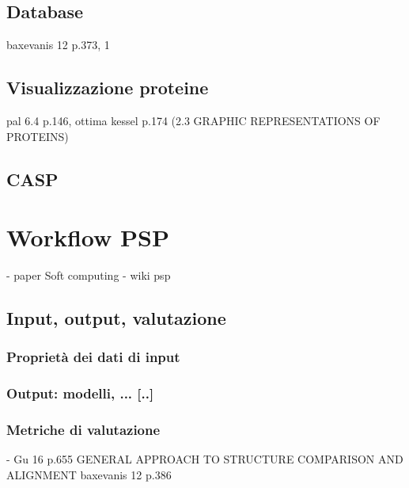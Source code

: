 \subsection{Database}
baxevanis 12 p.373, 1

\subsection{Visualizzazione proteine}
pal 6.4 p.146, ottima
kessel p.174 (2.3 GRAPHIC REPRESENTATIONS OF PROTEINS)

\subsection{CASP}

\section{Workflow PSP}
- paper Soft computing
- wiki psp

\subsection{Input, output, valutazione}
\subsubsection{Proprietà dei dati di input}

\subsubsection{Output: modelli, ... [..]}
\subsubsection{Metriche di valutazione}
- Gu 16 p.655 GENERAL APPROACH TO STRUCTURE COMPARISON AND ALIGNMENT
baxevanis 12 p.386


